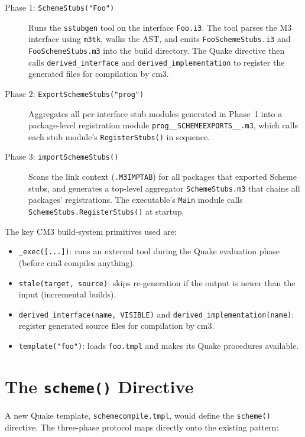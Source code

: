 \documentclass[12pt]{report}
\begin{document}
\begin{description}
\item[Phase 1: \texttt{SchemeStubs("Foo")}]
  Runs the \texttt{sstubgen} tool on the interface \texttt{Foo.i3}.
  The tool parses the M3 interface using \texttt{m3tk}, walks the
  AST, and emits \texttt{FooSchemeStubs.i3} and
  \texttt{FooSchemeStubs.m3} into the build directory.  The Quake
  directive then calls \texttt{derived\_interface} and
  \texttt{derived\_implementation} to register the generated files
  for compilation by cm3.

\item[Phase 2: \texttt{ExportSchemeStubs("prog")}]
  Aggregates all per-interface stub modules generated in Phase~1
  into a package-level registration module
  \texttt{prog\_\_SCHEMEEXPORTS\_\_.m3}, which calls each stub
  module's \texttt{RegisterStubs()} in sequence.

\item[Phase 3: \texttt{importSchemeStubs()}]
  Scans the link context (\texttt{.M3IMPTAB}) for all packages
  that exported Scheme stubs, and generates a top-level aggregator
  \texttt{SchemeStubs.m3} that chains all packages' registrations.
  The executable's \texttt{Main} module calls
  \texttt{SchemeStubs.RegisterStubs()} at startup.
\end{description}

The key CM3 build-system primitives used are:
\begin{itemize}
\item \texttt{\_exec([...])}: runs an external tool during the Quake
  evaluation phase (before cm3 compiles anything).
\item \texttt{stale(target, source)}: skips re-generation if the
  output is newer than the input (incremental builds).
\item \texttt{derived\_interface(name, VISIBLE)} and
  \texttt{derived\_implementation(name)}: register generated source
  files for compilation by cm3.
\item \texttt{template("foo")}: loads \texttt{foo.tmpl} and makes
  its Quake procedures available.
\end{itemize}

\section{The \texttt{scheme()} Directive}

A new Quake template, \texttt{schemecompile.tmpl}, would define
the \texttt{scheme()} directive.  The three-phase protocol maps
directly onto the existing pattern:
\end{document}
